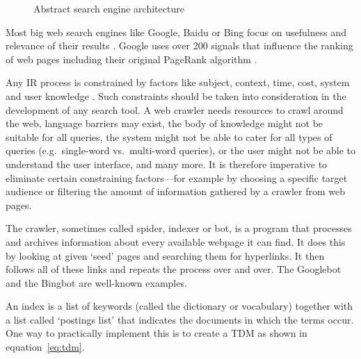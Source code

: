 \begin{figure}[!htbp]
  \centering
\caption[Search engine architecture]{Abstract search engine architecture}
\label{fig:sea}
\end{figure}

Most big web search engines like Google, Baidu or Bing focus on usefulness and relevance of their results \autocite{Google2012, Baidu2012, Microsoft2012a}. Google uses over 200 signals \autocite*{Google2012} that influence the ranking of web pages including their original PageRank algorithm \autocite{Brin1998, Brin1998b}.

Any \ac{IR} process is constrained by factors like subject, context, time, cost, system and user knowledge \autocite{Marchionini1988}. Such constraints should be taken into consideration in the development of any search tool. A web crawler needs resources to crawl around the web, language barriers may exist, the body of knowledge might not be suitable for all queries, the system might not be able to cater for all types of queries (e.g.\ single-word vs.\ multi-word queries), or the user might not be able to understand the user interface, and many more. It is therefore imperative to eliminate certain constraining factors---for example by choosing a specific target audience or filtering the amount of information gathered by a crawler from web pages.

The crawler, sometimes called spider, indexer or bot, is a program that processes and archives information about every available webpage it can find. It does this by looking at given `seed' pages and searching them for hyperlinks. It then follows all of these links and repeats the process over and over. The Googlebot \autocite*{Google2016} and the Bingbot \autocite*{Bing2016} are well-known examples.

An index is a list of keywords (called the dictionary or vocabulary) together with a list called `postings list' that indicates the documents in which the terms occur. One way to practically implement this is to create a \ac{TDM} as shown in equation~\ref{eq:tdm}\marginpar{$\bm{\Sigma}$~\ref{eq:tdm}}.

